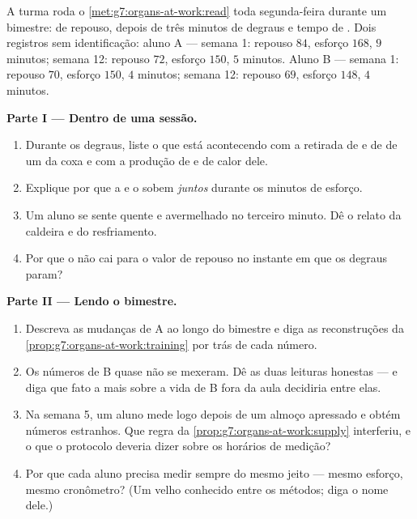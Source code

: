 \begin{problem}\label{pb:g7:organs-at-work:1}
A turma roda o \cref{met:g7:organs-at-work:read} toda segunda-feira
durante um bimestre:  de repouso,  depois de três minutos de
degraus e tempo de . Dois registros sem identificação:
aluno A --- semana 1: repouso $84$, esforço $168$,  $9$
minutos; semana 12: repouso $72$, esforço $150$,  $5$
minutos. Aluno B --- semana 1: repouso $70$, esforço $150$,
 $4$ minutos; semana 12: repouso $69$, esforço $148$,
 $4$ minutos.

\medskip\noindent\textbf{Parte I --- Dentro de uma sessão.}
\begin{enumerate}
  \item Durante os degraus, liste o que está acontecendo com a
        retirada de  e de  de um  da coxa e com
        a produção de  e de calor dele.
  \item Explique por que a  e o  sobem \emph{juntos}
        durante os minutos de esforço.
  \item Um aluno se sente quente e avermelhado no terceiro minuto. Dê
        o relato da caldeira e do resfriamento.
  \item Por que o  não cai para o valor de repouso no instante em
        que os degraus param?
\end{enumerate}

\medskip\noindent\textbf{Parte II --- Lendo o bimestre.}
\begin{enumerate}[resume]
  \item Descreva as mudanças de A ao longo do bimestre e diga as
        reconstruções da \cref{prop:g7:organs-at-work:training} por
        trás de cada número.
  \item Os números de B quase não se mexeram. Dê as duas leituras
        honestas --- e diga que fato a mais sobre a vida de B fora da
        aula decidiria entre elas.
  \item Na semana 5, um aluno mede logo depois de um almoço apressado
        e obtém números estranhos. Que regra da
        \cref{prop:g7:organs-at-work:supply} interferiu, e o que o
        protocolo deveria dizer sobre os horários de medição?
  \item Por que cada aluno precisa medir sempre do mesmo jeito ---
        mesmo esforço, mesmo cronômetro? (Um velho conhecido entre os
        métodos; diga o nome dele.)
\end{enumerate}


\end{problem}
